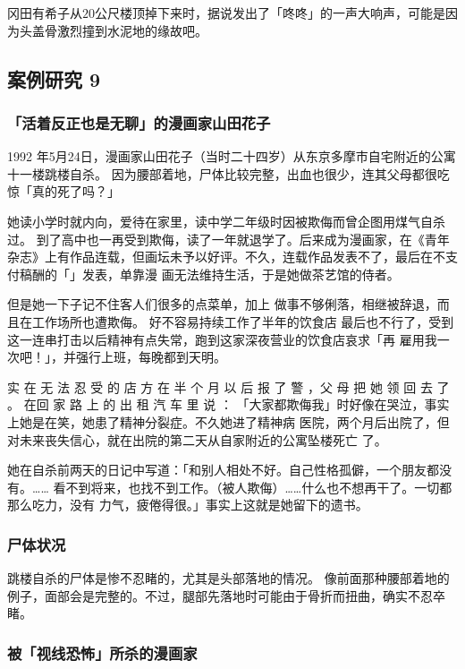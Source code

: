 \documentclass[UTF8]{ctexart}
\begin{document}
冈田有希子从$20$公尺楼顶掉下来时，据说发出了「咚咚」的一声大响声，可能是因为头盖骨激烈撞到水泥地的缘故吧。

\subsection{案例研究 9}
\subsubsection*{「活着反正也是无聊」的漫画家山田花子}

1992 年5月24日，漫画家山田花子（当时二十四岁）从东京多摩市自宅附近的公寓十一楼跳楼自杀。
因为腰部着地，尸体比较完整，出血也很少，连其父母都很吃惊「真的死了吗？」

她读小学时就内向，爱待在家里，读中学二年级时因被欺侮而曾企图用煤气自杀过。
到了高中也一再受到欺侮，读了一年就退学了。后来成为漫画家，在《青年杂志》上有作品连载，但画坛未予以好评。不久，连载作品发表不了，最后在不支付稿酬的「\qquad \qquad 」发表，单靠漫 画无法维持生活，于是她做茶艺馆的侍者。

但是她一下子记不住客人们很多的点菜单，加上 做事不够俐落，相继被辞退，而且在工作场所也遭欺侮。
好不容易持续工作了半年的饮食店 最后也不行了，受到这一连串打击以后精神有点失常，跑到这家深夜营业的饮食店哀求「再 雇用我一次吧！」，并强行上班，每晚都到天明。

实 在 无 法 忍 受 的 店 方 在 半 个 月 以 后 报 了 警 ，父 母 把 她 领 回 去 了 。
在回 家 路 上 的 出 租 汽 车 里 说 ： 「大家都欺侮我」时好像在哭泣，事实上她是在笑，她患了精神分裂症。不久她进了精神病 医院，两个月后出院了，但对未来丧失信心，就在出院的第二天从自家附近的公寓坠楼死亡 了。

她在自杀前两天的日记中写道：「和别人相处不好。自己性格孤僻，一个朋友都没有。…… 看不到将来，也找不到工作。（被人欺侮）……什么也不想再干了。一切都那么吃力，没有 力气，疲倦得很。」事实上这就是她留下的遗书。

\subsubsection*{尸体状况}

跳楼自杀的尸体是惨不忍睹的，尤其是头部落地的情况。
像前面那种腰部着地的例子，面部会是完整的。不过，腿部先落地时可能由于骨折而扭曲，确实不忍卒睹。

\subsubsection*{被「视线恐怖」所杀的漫画家}
\end{document}
